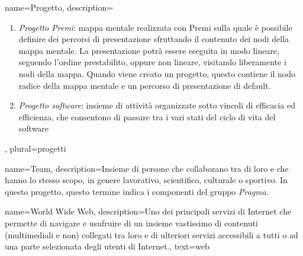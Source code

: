 {
name={Progetto},
description={\begin{enumerate}
\item \textit{Progetto Premi}: mappa mentale realizzata con Premi sulla quale è possibile definire dei percorsi di presentazione sfruttando il contenuto dei nodi della mappa mentale. La presentazione potrà essere eseguita in modo lineare, seguendo l'ordine prestabilito, oppure non lineare, visitando liberamente i nodi della mappa. Quando viene creato un progetto, questo contiene il nodo radice della mappa mentale e un percorso di presentazione di default.
\item \textit{Progetto software}: insieme di attività organizzate sotto vincoli di efficacia ed efficienza, che consentono di passare tra i vari stati del ciclo di vita del software
\end{enumerate}
},
plural={progetti}
}

{
name={Team},
description={Insieme di persone che collaborano tra di loro e che hanno lo stesso scopo, in genere lavorativo, scientifico, culturale o sportivo. In questo progetto, questo termine indica i componenti del gruppo \textit{Pragma}.}
}

{
name={World Wide Web},
description={Uno dei principali servizi di Internet che permette di navigare e usufruire di un insieme vastissimo di contenuti (multimediali e non) collegati tra loro e di ulteriori servizi accessibili a tutti o ad una parte selezionata degli utenti di Internet.},
text={web}
}
